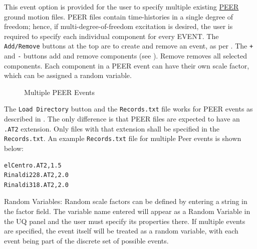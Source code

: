 This event option is provided for the user to specify multiple existing
\href{http://peer.berkeley.edu}{PEER} ground
motion files. PEER files contain time-histories in a single degree of freedom; hence, if multi-degree-of-freedom excitation is desired, the user is required to specify each
individual component for every EVENT. The \texttt{Add/Remove} buttons
at the top are to create and remove an event, as
per . The \texttt{+} and \texttt{-} buttons add and remove
components (see ). Remove removes all selected components. Each
component in a PEER event can have their own scale factor, which can be assigned a random variable.

\begin{figure}[!htbp]
  \caption{Multiple PEER Events}
  \label{fig:PEER_event_panel}
\end{figure}

The \texttt{Load Directory} button and the \texttt{Records.txt} file works for PEER events as described in . The only difference is that PEER files are expected to have an \texttt{.AT2} extension. Only files with that extension shall be specified in the \texttt{Records.txt}.
An example \texttt{Records.txt} file for multiple Peer
events is shown below:

\begin{verbatim}
elCentro.AT2,1.5
Rinaldi228.AT2,2.0
Rinaldi318.AT2,2.0
\end{verbatim}

Random Variables: Random scale factors can be defined by entering a string in the factor field. The variable name entered will appear as a Random Variable in the UQ panel and the user must specify its properties there. If multiple
events are specified, the event itself will be treated as a random
variable, with each event being part of the discrete set of possible
events.
